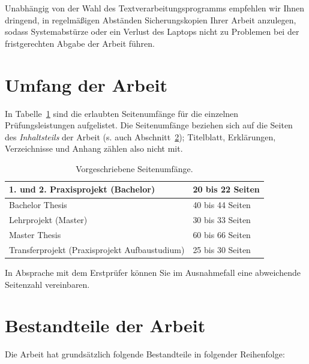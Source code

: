 Unabhängig von der Wahl des Textverarbeitungsprogramms empfehlen wir Ihnen dringend, in regelmäßigen Abständen Sicherungskopien Ihrer Arbeit anzulegen, sodass Systemabstürze oder ein Verlust des Laptops nicht zu Problemen bei der fristgerechten Abgabe der Arbeit führen.

\section{Umfang der Arbeit}

In Tabelle~\ref{tab:seitenumfang} sind die erlaubten Seitenumfänge für die einzelnen Prüfungsleistungen aufgelistet.
Die Seitenumfänge beziehen sich auf die Seiten des \textit{Inhaltsteils} der Arbeit (s. auch Abschnitt~\ref{sec:bestandteile-der-arbeit}); Titelblatt, Erklärungen, Verzeichnisse und Anhang zählen also nicht mit.

\begin{table}[ht]
\centering
\begin{tabular}{|p{8cm}| p{3cm}|}
\hline
     1. und 2. Praxisprojekt (Bachelor) & 20 bis 22 Seiten \\\hline
     Bachelor Thesis & 40 bis 44 Seiten \\\hline
     Lehrprojekt (Master) & 30 bis 33 Seiten \\\hline
     Master Thesis & 60 bis 66 Seiten \\\hline
     Transferprojekt (Praxisprojekt Aufbaustudium) & 25 bis 30 Seiten \\\hline
\end{tabular}
\caption{\label{tab:seitenumfang}Vorgeschriebene Seitenumfänge.}
\end{table}

In Absprache mit dem Erstprüfer können Sie im Ausnahmefall eine abweichende Seitenzahl vereinbaren.


\section{Bestandteile der Arbeit}
\label{sec:bestandteile-der-arbeit}

Die Arbeit hat grundsätzlich folgende Bestandteile in folgender Reihenfolge:

